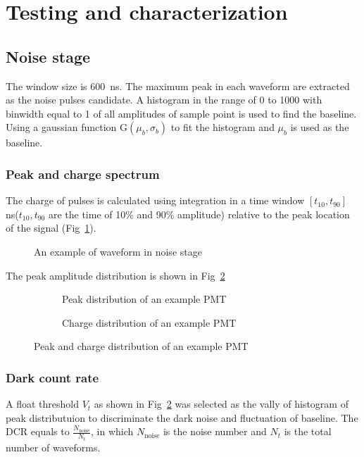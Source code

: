 \section{Testing and characterization}
\label{Result}
\subsection{Noise stage}
The window size is \SI{600}{ns}. The maximum peak in each waveform are extracted as the noise pulses candidate. A histogram in the range of 0 to 1000 with binwidth equal to 1 of all amplitudes of sample point is used to find the baseline. Using a gaussian function G$(\mu_b,\sigma_b)$ to fit the histogram and $\mu_b$ is used as the baseline.
\subsubsection{Peak and charge spectrum}
\label{sec:noisepeak}
The charge of pulses is calculated using integration in a time window $[t_{10}, t_{90}]$ ns($t_{10}, t_{90}$ are the time of 10\% and 90\% amplitude) relative to the peak location of the signal (Fig~\ref{fig:waveform}).
\begin{figure}
    \caption{An example of waveform in noise stage}
    \label{fig:waveform}
\end{figure}

The peak amplitude distribution is shown in Fig~\ref{fig:peak}
\begin{figure}[!htbp]
    \centering
    \begin{subfigure}[b]{0.35\textwidth}
        \caption{Peak distribution of an example PMT}%
        \label{fig:peak}
    \end{subfigure}
    \begin{subfigure}[b]{0.35\textwidth}
        \caption{Charge distribution of an example PMT}%
        \label{fig:charge}
    \end{subfigure}
    \caption{Peak and charge distribution of an example PMT}
\end{figure}
\subsubsection{Dark count rate}
A float threshold $V_{t}$ as shown in Fig~\ref{fig:peak} was selected as the vally of histogram of peak distributuion to discriminate the dark noise and fluctuation of baseline. The DCR equals to $\frac{N_{\mathrm{noise}}}{N_{t}}$, in which $N_{\mathrm{noise}}$ is the noise number and $N_{t}$ is the total number of waveforms.
